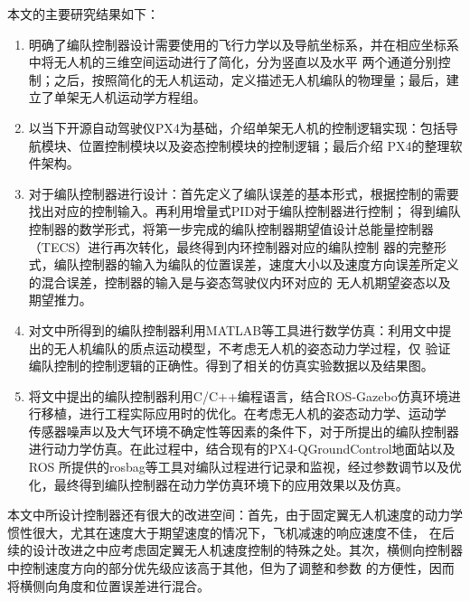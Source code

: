 本文的主要研究结果如下：
\begin{enumerate}
    \item 明确了编队控制器设计需要使用的飞行力学以及导航坐标系，并在相应坐标系中将无人机的三维空间运动进行了简化，分为竖直以及水平
        两个通道分别控制；之后，按照简化的无人机运动，定义描述无人机编队的物理量；最后，建立了单架无人机运动学方程组。
    \item 以当下开源自动驾驶仪PX4为基础，介绍单架无人机的控制逻辑实现：包括导航模块、位置控制模块以及姿态控制模块的控制逻辑；最后介绍
        PX4的整理软件架构。
    \item 对于编队控制器进行设计：首先定义了编队误差的基本形式，根据控制的需要找出对应的控制输入。再利用增量式PID对于编队控制器进行控制；
        得到编队控制器的数学形式，将第一步完成的编队控制器期望值设计总能量控制器（TECS）进行再次转化，最终得到内环控制器对应的编队控制
        器的完整形式，编队控制器的输入为编队的位置误差，速度大小以及速度方向误差所定义的混合误差，控制器的输入是与姿态驾驶仪内环对应的
        无人机期望姿态以及期望推力。
    \item 对文中所得到的编队控制器利用MATLAB等工具进行数学仿真：利用文中提出的无人机编队的质点运动模型，不考虑无人机的姿态动力学过程，仅
        验证编队控制的控制逻辑的正确性。得到了相关的仿真实验数据以及结果图。
    \item 将文中提出的编队控制器利用C/C++编程语言，结合ROS-Gazebo仿真环境进行移植，进行工程实际应用时的优化。在考虑无人机的姿态动力学、运动学
        传感器噪声以及大气环境不确定性等因素的条件下，对于所提出的编队控制器进行动力学仿真。在此过程中，结合现有的PX4-QGroundControl地面站以及ROS
        所提供的rosbag等工具对编队过程进行记录和监视，经过参数调节以及优化，最终得到编队控制器在动力学仿真环境下的应用效果以及仿真。
\end{enumerate}
本文中所设计控制器还有很大的改进空间：首先，由于固定翼无人机速度的动力学惯性很大，尤其在速度大于期望速度的情况下，飞机减速的响应速度不佳，
在后续的设计改进之中应考虑固定翼无人机速度控制的特殊之处。其次，横侧向控制器中控制速度方向的部分优先级应该高于其他，但为了调整和参数
的方便性，因而将横侧向角度和位置误差进行混合。
